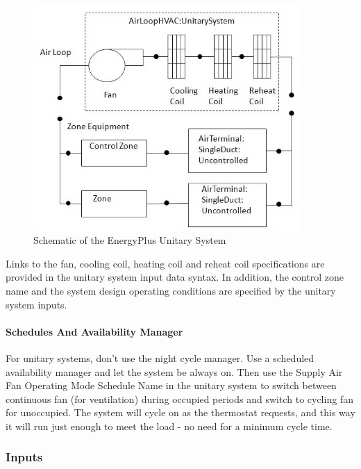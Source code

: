 \begin{figure}[hbtp] %
\centering
\includegraphics[width=0.9\textwidth, height=0.9\textheight, keepaspectratio=true]{media/image294.png}
\caption{Schematic of the EnergyPlus Unitary System \protect \label{fig:schematic-of-the-energyplus-unitary-system}}
\end{figure}

Links to the fan, cooling coil, heating coil and reheat coil specifications are provided in the unitary system input data syntax. In addition, the control zone name and the system design operating conditions are specified by the unitary system inputs.

\paragraph{Schedules And Availability Manager}\label{schedules-and-availability-manager}

For unitary systems, don't use the night cycle manager. Use a scheduled availability manager and let the system be always on. Then use the Supply Air Fan Operating Mode Schedule Name in the unitary system to switch between continuous fan (for ventilation) during occupied periods and switch to cycling fan for unoccupied. The system will cycle on as the thermostat requests, and this way it will run just enough to meet the load - no need for a minimum cycle time.

\subsubsection{Inputs}\label{inputs-049}

